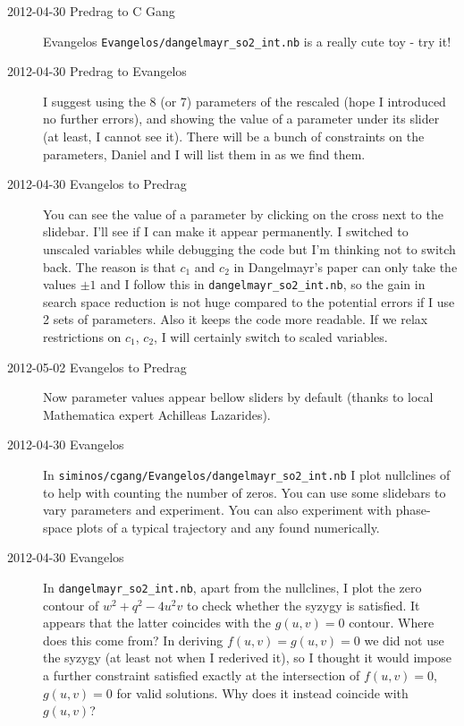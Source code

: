 \begin{description}
\item[2012-04-30 Predrag to C Gang] Evangelos
\texttt{Evangelos/dangelmayr\_so2\_int.nb} is a really cute toy - try it!

\item[2012-04-30 Predrag to Evangelos] I suggest using the 8 (or 7)
parameters of the rescaled  (hope I introduced no
further errors), and showing the value of a parameter under its slider
(at least, I cannot see it). There will be a bunch of constraints on the
parameters, Daniel and I will list them in as we find them.

\item[2012-04-30 Evangelos to Predrag] You can see the value of a parameter by
clicking on the cross next to the slidebar. I'll see if I can make it appear
permanently. I switched to unscaled variables while debugging the code but
I'm thinking not to switch back. The reason is that $c_1$ and $c_2$ in
Dangelmayr's paper can only take the values $\pm1$ and I follow this in
\texttt{dangelmayr\_so2\_int.nb}, so the gain in search space reduction is
not huge compared to the potential errors if I use 2 sets of parameters.
Also it keeps the code more readable. If we relax
restrictions on $c_1$, $c_2$, I will certainly switch to scaled variables.

\item[2012-05-02 Evangelos to Predrag] Now parameter values appear  bellow
sliders by default (thanks to local Mathematica expert Achilleas Lazarides).

\item[2012-04-30 Evangelos] In \texttt{siminos/cgang/Evangelos/dangelmayr\_so2\_int.nb}
I plot nullclines of  to help with counting the number of
zeros. You can use some slidebars to vary parameters and experiment. You can
also experiment with phase-space plots of a typical trajectory and any {\reqva} found numerically.

\item[2012-04-30 Evangelos] In \texttt{dangelmayr\_so2\_int.nb}, apart from
the nullclines, I plot the zero contour of $w^2+q^2-4u^2v$ to check whether
the syzygy is satisfied. It appears that the latter coincides with the $g(u,v)=0$
contour. Where does this come from? In deriving $f(u,v)=g(u,v)=0$ we did not
use the syzygy (at least not when I rederived it), so I thought it would impose
a further constraint satisfied exactly at the intersection of $f(u,v)=0$,
$g(u,v)=0$ for valid solutions. Why does it instead coincide with $g(u,v)$?


\end{description}

